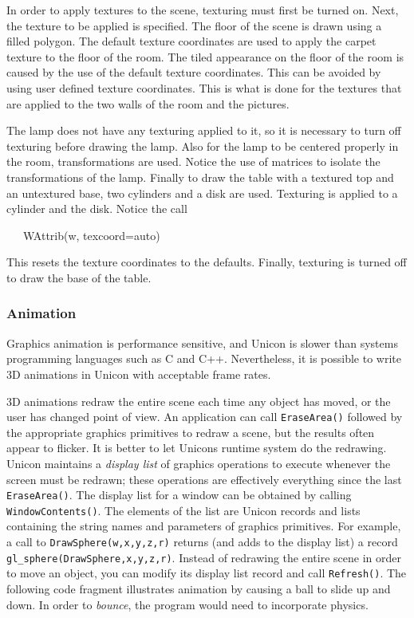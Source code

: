 In order to apply textures to the scene, texturing must first be turned
on. Next, the texture to be applied is specified. The floor of the
scene is drawn using a filled polygon. The default texture coordinates
are used to apply the carpet texture to the floor of the room. The
tiled appearance on the floor of the room is caused by the use of the
default texture coordinates. This can be avoided by using user
defined texture coordinates. This is what is done for the textures that
are applied to the two walls of the room and the pictures. 

The lamp does not have any texturing applied to it, so it is necessary
to turn off texturing before drawing the lamp. Also for the lamp to be
centered properly in the room, transformations are used. Notice the use
of matrices to isolate the transformations of the lamp. Finally to draw
the table with a textured top and an untextured base, two cylinders and
a disk are used. Texturing is applied to a cylinder and the disk.
Notice the call 

\ \ \ WAttrib(w, {\textquotedbl}texcoord=auto{\textquotedbl})

This resets the texture coordinates to the defaults. Finally, texturing
is turned off to draw the base of the table.

\subsubsection{Animation}

Graphics animation is performance sensitive, and Unicon is slower than
systems programming languages such as C and C++. Nevertheless, it is
possible to write 3D animations in Unicon with acceptable frame rates.

3D animations redraw the entire scene each time any object has moved, or
the user has changed point of view. An application can call \texttt{EraseArea()}
followed by the appropriate graphics primitives to redraw a scene, but
the results often appear to flicker. It is better to let
Unicon{\textquotesingle}s runtime system do the redrawing. Unicon
maintains a \textit{display list} of graphics operations to execute
whenever the screen must be redrawn; these operations are effectively
everything since the last \texttt{EraseArea()}. The display list for a window
can be obtained by calling \texttt{WindowContents()}. The elements of the list
are Unicon records and lists containing the string names and parameters
of graphics primitives. For example, a call to \texttt{DrawSphere(w,x,y,z,r)}
returns (and adds to the display list) a record
\texttt{gl\_sphere({\textquotedbl}DrawSphere{\textquotedbl},x,y,z,r)}. Instead
of redrawing the entire scene in order to move an object, you can
modify its display list record and call \texttt{Refresh()}. The following code
fragment illustrates animation by causing a ball to slide up and down.
In order to \textit{bounce}, the program would need to incorporate
physics. 

